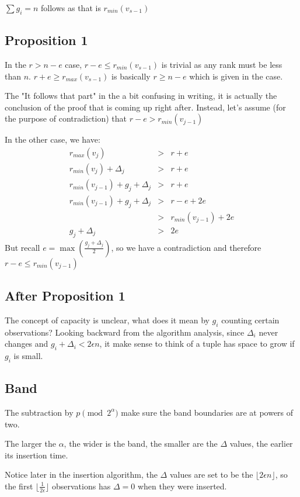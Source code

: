 \documentclass{article}
\begin{document}
$ \sum{g_i} = n $ follows as that is $ r_{min}(v_{s-1}) $

\subsection*{Proposition 1}
In the $ r > n - e $ case, $ r - e \le r_{min}(v_{s-1}) $ is trivial as any rank must be less than $ n $.
$ r + e \ge r_{max}(v_{s-1}) $ is basically $ r \ge n - e $ which is given in the case.

The "It follows that part" in the a bit confusing in writing, it is actually the conclusion of the proof that is coming up right after. Instead, let's assume (for the purpose of contradiction) that $ r - e > r_{min}(v_{j-1}) $ 

In the other case, we have:
\begin{eqnarray*}
  r_{max}(v_j) &>& r + e \\
  r_{min}(v_j) + \Delta_{j} &>& r + e \\
  r_{min}(v_{j-1}) + g_j + \Delta_{j} &>& r + e \\
  r_{min}(v_{j-1}) + g_j + \Delta_{j} &>& r - e + 2e \\
                                      &>& r_{min}(v_{j-1}) + 2e \\
                     g_j + \Delta_{j} &>& 2e 
\end{eqnarray*}
But recall $ e = \max(\frac{g_j + \Delta_{j}}{2}) $, so we have a contradiction and therefore $ r - e \le r_{min}(v_{j-1}) $

\subsection*{After Proposition 1}
The concept of capacity is unclear, what does it mean by $ g_i $ counting certain observations? Looking backward from the algorithm analysis, since $ \Delta_i $ never changes and $ g_i + \Delta_i < 2\epsilon n $, it make sense to think of a tuple has space to grow if $ g_i $ is small.

\subsection*{Band}
The subtraction by $ p \pmod 2^\alpha $ make sure the band boundaries are at powers of two. 

The larger the $ \alpha $, the wider is the band, the smaller are the $ \Delta $ values, the earlier its insertion time.

Notice later in the insertion algorithm, the $ \Delta $ values are set to be the $ \lfloor 2\epsilon n \rfloor $, so the first $ \lfloor \frac{1}{2\epsilon} \rfloor $ observations has $ \Delta = 0 $ when they were inserted.  
\end{document}

